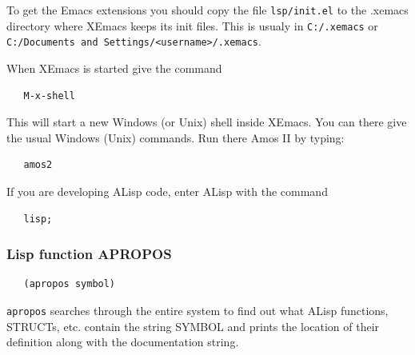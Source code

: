 To get the Emacs extensions you should copy the file {\tt lsp/init.el}
to the .xemacs directory where XEmacs keeps its init files. This is
usualy in {\tt C:/.xemacs} or {\tt C:/Documents and
Settings/<username>/.xemacs}.

When XEmacs is started give the command
\begin{verbatim}
   M-x-shell
\end{verbatim}
This will start a new Windows (or Unix) shell inside XEmacs. You can there give the usual Windows (Unix) commands. Run there Amos II by typing:
\begin{verbatim}
   amos2
\end{verbatim}
If you are developing ALisp code, enter ALisp with the command
\begin{verbatim}
   lisp;
\end{verbatim}

\subsubsection*{Lisp function APROPOS}

\begin{verbatim}
   (apropos symbol)
\end{verbatim}
{\tt apropos} searches through the entire system to find out what
ALisp functions, STRUCTs, etc. contain the string SYMBOL and prints
the location of their definition along with the documentation string.

